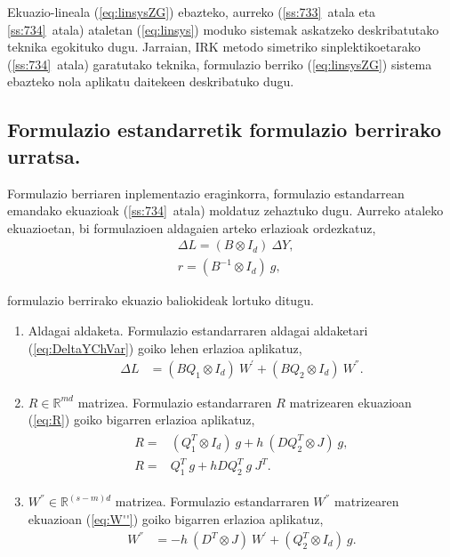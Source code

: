 Ekuazio-lineala (\ref{eq:linsysZG}) ebazteko, aurreko (\ref{ss:733}~atala eta \ref{ss:734}~atala) ataletan (\ref{eq:linsys}) moduko sistemak askatzeko deskribatutako teknika egokituko dugu. Jarraian, IRK metodo simetriko sinplektikoetarako (\ref{ss:734}~atala) garatutako teknika, formulazio berriko (\ref{eq:linsysZG}) sistema ebazteko nola aplikatu daitekeen deskribatuko dugu.

\subsection*{Formulazio estandarretik formulazio berrirako urratsa.}

Formulazio berriaren inplementazio eraginkorra, formulazio estandarrean emandako ekuazioak (\ref{ss:734}~atala) moldatuz zehaztuko dugu.
Aurreko ataleko ekuazioetan, bi formulazioen aldagaien arteko erlazioak ordezkatuz,
\begin{align}
\label{eq:er1}
&\Delta L =(B \otimes I_d) \ \Delta Y,\\
\label{eq:er2}
&r=(B^{-1} \otimes I_d) \ g,
\end{align}

formulazio berrirako  ekuazio baliokideak lortuko ditugu.
\begin{enumerate}

\item Aldagai aldaketa.
Formulazio estandarraren aldagai aldaketari (\ref{eq:DeltaYChVar}) goiko lehen erlazioa aplikatuz,
\begin{align}
\Delta L &=(B Q_1 \otimes I_d) \ W^{'}+(B Q_2 \otimes I_d) \ W^{''}.
\end{align}

\item $R\in \mathbb{R}^{md}$ matrizea.
Formulazio estandarraren $R$ matrizearen ekuazioan (\ref{eq:R}) goiko bigarren erlazioa aplikatuz,
\begin{align}
\begin{split}
R=&(Q_1^T \otimes I_d) \ g + h \ (D Q_2^T \otimes J) \ g,  \\
R=& Q_1^T \ g  + h D Q_2^T \ g \ J^T.
\end{split}
\end{align}

\item $W^{''}\in \mathbb{R}^{(s-m)d}$ matrizea.
Formulazio estandarraren $W^{''}$ matrizearen ekuazioan (\ref{eq:W''}) goiko bigarren erlazioa aplikatuz,
\begin{align}
W^{''}&= -h \ (D^T \otimes J) \ W^{'}+ (Q_2^T \otimes I_d) \ g.
\end{align}


\end{enumerate}


